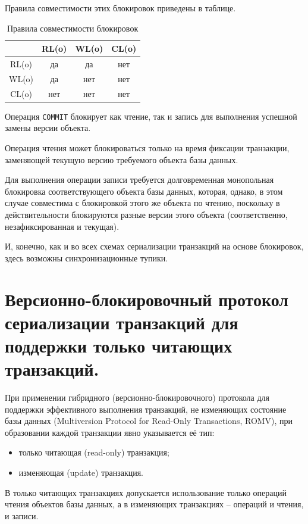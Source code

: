 \documentclass[a4paper,12pt]{article}
\begin{document}
Правила совместимости этих блокировок приведены в таблице.

\begin{table}[h!]
    \centering
    \begin{tabular}{|c|c|c|c|}
        \hline
          & RL(o) & WL(o) & CL(o) \\
        \hline
        RL(o) & да & да & нет \\
        WL(o) & да & нет & нет \\
        CL(o) & нет & нет & нет \\
        \hline
    \end{tabular}
    \caption{Правила совместимости блокировок}
\end{table}

Операция \texttt{COMMIT} блокирует как чтение, так и запись для выполнения успешной замены версии объекта.

Операция чтения может блокироваться только на время фиксации транзакции, заменяющей текущую версию требуемого объекта базы данных.

Для выполнения операции записи требуется долговременная монопольная блокировка соответствующего объекта базы данных, которая, однако, в этом случае совместима с блокировкой этого же объекта по чтению, поскольку в действительности блокируются разные версии этого объекта (соответственно, незафиксированная и текущая).

И, конечно, как и во всех схемах сериализации транзакций на основе блокировок, здесь возможны синхронизационные тупики.

\section{Версионно-блокировочный протокол сериализации транзакций для поддержки только читающих транзакций.}

При применении гибридного (версионно-блокировочного) протокола для поддержки эффективного выполнения транзакций, не изменяющих состояние базы данных (Multiversion Protocol for Read-Only Transactions, ROMV), при образовании каждой транзакции явно указывается её тип:
\begin{itemize}
    \item только читающая (read-only) транзакция;
    \item изменяющая (update) транзакция.
\end{itemize}

В только читающих транзакциях допускается использование только операций чтения объектов базы данных, а в изменяющих транзакциях – операций и чтения, и записи.
\end{document}

